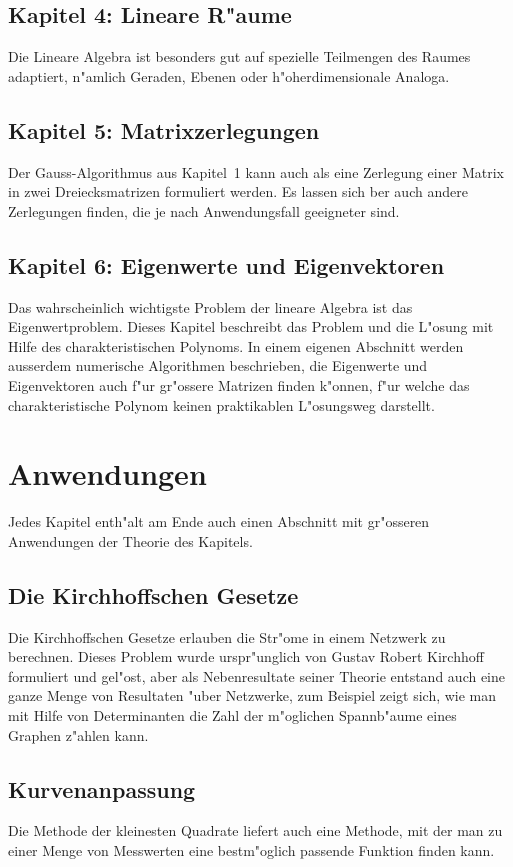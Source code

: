 \subsection*{Kapitel 4: Lineare R"aume}
Die Lineare Algebra ist besonders gut auf spezielle
Teilmengen des Raumes adaptiert, n"amlich Geraden,
Ebenen oder h"oherdimensionale Analoga.

\subsection*{Kapitel 5: Matrixzerlegungen}
Der Gauss-Algorithmus aus Kapitel~1 kann auch als eine
Zerlegung einer Matrix in zwei Dreiecksmatrizen formuliert werden.
Es lassen sich ber auch andere Zerlegungen finden, die je
nach Anwendungsfall geeigneter sind.

\subsection*{Kapitel 6: Eigenwerte und Eigenvektoren}
Das wahrscheinlich wichtigste Problem der lineare Algebra
ist das Eigenwertproblem. 
Dieses Kapitel beschreibt das Problem und die L"osung mit Hilfe
des charakteristischen Polynoms.
In einem eigenen Abschnitt werden ausserdem numerische Algorithmen
beschrieben, die Eigenwerte und Eigenvektoren auch f"ur gr"ossere
Matrizen finden k"onnen, f"ur welche das charakteristische 
Polynom keinen praktikablen L"osungsweg darstellt.

\section*{Anwendungen}
Jedes Kapitel enth"alt am Ende auch einen Abschnitt mit gr"osseren
Anwendungen der Theorie des Kapitels. 

\subsection*{Die Kirchhoffschen Gesetze}
Die Kirchhoffschen Gesetze erlauben die Str"ome in einem Netzwerk
zu berechnen. 
Dieses Problem wurde urspr"unglich von Gustav Robert Kirchhoff
formuliert und gel"ost, aber als Nebenresultate seiner Theorie
entstand auch eine ganze Menge von Resultaten "uber Netzwerke,
zum Beispiel zeigt sich, wie man mit Hilfe von Determinanten
die Zahl der m"oglichen Spannb"aume eines Graphen z"ahlen kann.

\subsection*{Kurvenanpassung}
Die Methode der kleinesten Quadrate liefert auch eine Methode,
mit der man zu einer Menge von Messwerten eine bestm"oglich passende
Funktion finden kann.


